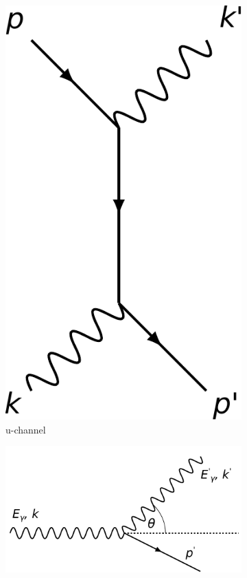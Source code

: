 \begin{figure}
\begin{subfigure}{0.2\textwidth}
		\includegraphics[width=\textwidth]{./img/t-channel.pdf}
		\caption{u-channel}
		\label{fig:tchannel}
	\end{subfigure}
	\par\bigskip
	\begin{subfigure}{0.45\textwidth}
		\centering
		\includegraphics[width=\textwidth]{./img/kinematic.pdf}

\end{subfigure}
\end{figure}
